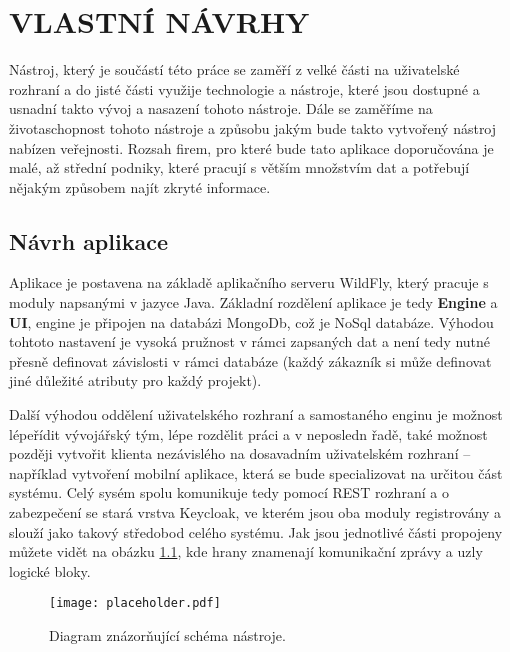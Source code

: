\chapter{VLASTNÍ NÁVRHY}
\par Nástroj, který je součástí této práce se zaměří z velké části na uživatelské rozhraní a do jisté části využije technologie a nástroje, které jsou dostupné a usnadní takto vývoj a nasazení tohoto nástroje. Dále se zaměříme na životaschopnost tohoto nástroje a způsobu jakým bude takto vytvořený nástroj nabízen veřejnosti. Rozsah firem, pro které bude tato aplikace doporučována je malé, až střední podniky, které pracují s větším množstvím dat a potřebují nějakým způsobem najít zkryté informace.

\section{Návrh aplikace}
\par Aplikace je postavena na základě aplikačního serveru WildFly, který pracuje s moduly napsanými v jazyce Java. Základní rozdělení aplikace je tedy \textbf{Engine} a \textbf{UI}, engine je připojen na databázi MongoDb, což je NoSql databáze. Výhodou tohtoto nastavení je vysoká pružnost v rámci zapsaných dat a není tedy nutné  přesně definovat závislosti v rámci databáze (každý zákazník si může definovat jiné důležité atributy pro každý projekt).
\par Další výhodou oddělení uživatelského rozhraní a samostaného enginu je možnost lépeřídit vývojářský tým, lépe rozdělit práci a v neposledn řadě, také možnost později vytvořit klienta nezávislého na dosavadním uživatelském rozhraní -- například vytvoření mobilní aplikace, která se bude specializovat na určitou část systému. Celý sysém spolu komunikuje tedy pomocí REST rozhraní a o zabezpečení se stará vrstva Keycloak, ve kterém jsou oba moduly registrovány a slouží jako takový středobod celého systému. Jak jsou jednotlivé části propojeny můžete vidět na obázku \ref{schema}, kde hrany znamenají komunikační zprávy a uzly logické bloky.

\begin{figure}[htp]
  \centering
  \texttt{[image: placeholder.pdf]}
  \caption{Diagram znázorňující schéma nástroje.}
  \label{schema}
\end{figure}


